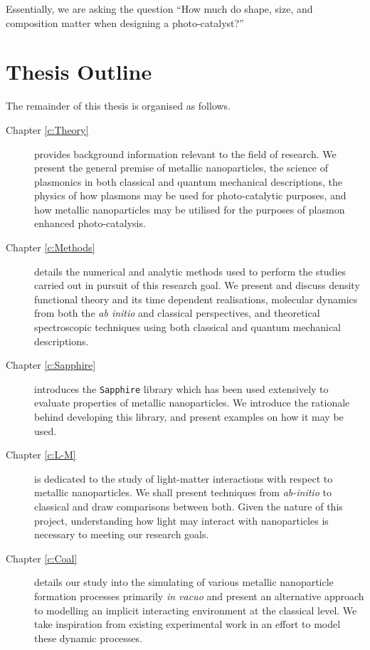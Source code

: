Essentially, we are asking the question ``How much do shape, size, and composition matter when designing a photo-catalyst?''

\section{Thesis Outline}
\label{s:Outline}

The remainder of this thesis is organised as follows. 

\begin{description}

  \item[Chapter \ref{c:Theory}] provides background information relevant to the field of research. We present the general premise of metallic nanoparticles, the science of plasmonics in both classical and quantum mechanical descriptions, the physics of how plasmons may be used for photo-catalytic purposes, and how metallic nanoparticles may be utilised for the purposes of plasmon enhanced photo-catalysis.

  \item[Chapter \ref{c:Methods}]  details the numerical and analytic methods used to perform the studies carried out in pursuit of this research goal. We present and discuss density functional theory and its time dependent realisations, molecular dynamics from both the \textit{ab initio} and classical perspectives, and theoretical spectroscopic techniques using both classical and quantum mechanical descriptions.
  
  \item[Chapter \ref{c:Sapphire}] introduces the \texttt{Sapphire} library which has been used extensively to evaluate properties of metallic nanoparticles. We introduce the rationale behind developing this library, and present examples on how it may be used.

  \item[Chapter \ref{c:L-M}] is dedicated to the study of light-matter interactions with respect to metallic nanoparticles. We shall present techniques from \textit{ab-initio} to classical and draw comparisons between both. Given the nature of this project, understanding how light may interact with nanoparticles is necessary to meeting our research goals.
    
  \item[Chapter \ref{c:Coal}] details our study into the simulating of various metallic nanoparticle formation processes primarily \textit{in vacuo} and present an alternative approach to modelling an implicit interacting environment at the classical level. We take inspiration from existing experimental work in an effort to model these dynamic processes. 


\end{description}

